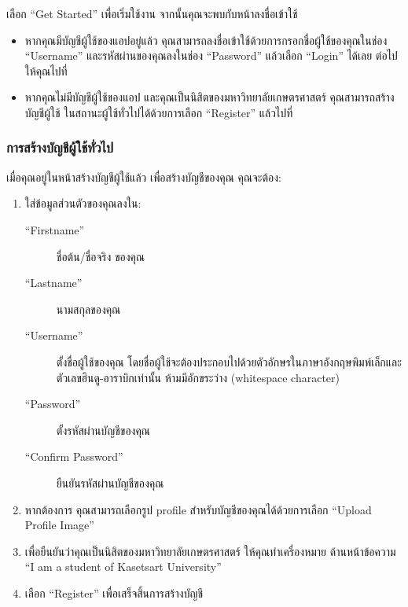 
เลือก ``Get Started'' เพื่อเริ่มใช้งาน จากนั้นคุณจะพบกับหน้าลงชื่อเข้าใช้


\begin{itemize}
    \item หากคุณมีบัญชีผู้ใช้ของแอปอยู่แล้ว
คุณสามารถลงชื่อเข้าใช้ด้วยการกรอกชื่อผู้ใช้ของคุณในช่อง ``Username'' และรหัสผ่านของคุณลงในช่อง ``Password''
แล้วเลือก ``Login'' ได้เลย ต่อไปให้คุณไปที่~
    \item หากคุณไม่มีบัญชีผู้ใช้ของแอป และคุณเป็นนิสิตของมหาวิทยาลัยเกษตรศาสตร์ คุณสามารถสร้างบัญชีผู้ใช้\relax
ในสถานะผู้ใช้ทั่วไปได้ด้วยการเลือก ``Register'' แล้วไปที่ 
\end{itemize}

\subsubsection{การสร้างบัญชีผู้ใช้ทั่วไป}\label{subsubsec:register-consumer-acct}


เมื่อคุณอยู่ในหน้าสร้างบัญชีผู้ใช้แล้ว เพื่อสร้างบัญชีของคุณ คุณจะต้อง:

\begin{enumerate}
    \item ใส่ข้อมูลส่วนตัวของคุณลงใน:
        \begin{description}
            \item[``Firstname''] ชื่อต้น/ชื่อจริง ของคุณ
            \item[``Lastname''] นามสกุลของคุณ
            \item[``Username''] \parbox[t]{0.5\textwidth}{ตั้งชื่อผู้ใช้ของคุณ โดยชื่อผู้ใช้จะต้องประกอบไปด้วยตัวอักษรในภาษาอังกฤษพิมพ์เล็กและตัวเลขฮินดู-อาราบิกเท่านั้น ห้ามมีอักขระว่าง (whitespace character)}
            \item[``Password''] ตั้งรหัสผ่านบัญชีของคุณ
            \item[``Confirm Password''] ยืนยันรหัสผ่านบัญชีของคุณ
        \end{description}
    \item หากต้องการ คุณสามารถเลือกรูป profile สำหรับบัญชีของคุณได้ด้วยการเลือก ``Upload Profile Image''
    \item เพื่อยืนยันว่าคุณเป็นนิสิตของมหาวิทยาลัยเกษตรศาสตร์ ให้คุณทำเครื่องหมาย \checkmark{} ด้านหน้าข้อความ ``I am a student of Kasetsart University''
    \item เลือก ``Register'' เพื่อเสร็จสิ้นการสร้างบัญชี
\end{enumerate}

